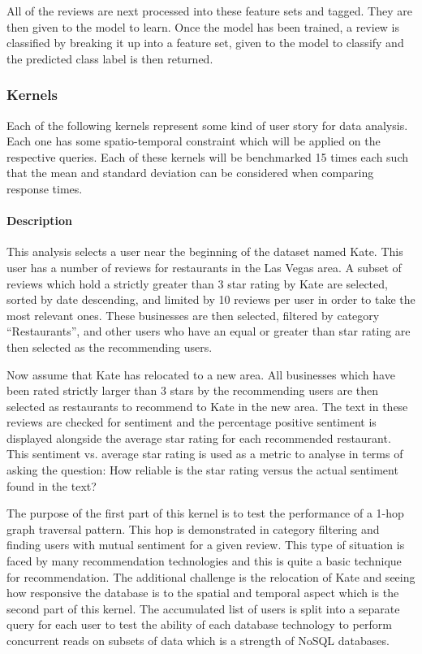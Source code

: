 All of the reviews are next processed into these feature sets and tagged. They are then given to the model to learn. Once the model has been trained, a review is classified by breaking it up into a feature set, given to the model to classify and the predicted class label is then returned.

\subsubsection{Kernels}
\label{sec:kernels}

Each of the following kernels represent some kind of user story for data analysis. Each one has some spatio-temporal constraint which will be applied on the respective queries. Each of these kernels will be benchmarked 15 times each such that the mean and standard deviation can be considered when comparing response times.


\paragraph{Description}
This analysis selects a user near the beginning of the dataset named Kate. This user has a number of reviews for restaurants in the Las Vegas area. A subset of reviews which hold a strictly greater than 3 star rating by Kate are selected, sorted by date descending, and limited by 10 reviews per user in order to take the most relevant ones. These businesses are then selected, filtered by category ``Restaurants'', and other users who have an equal or greater than star rating are then selected as the recommending users.

Now assume that Kate has relocated to a new area. All businesses which have been rated strictly larger than 3 stars by the recommending users are then selected as restaurants to recommend to Kate in the new area. The text in these reviews are checked for sentiment and the percentage positive sentiment is displayed alongside the average star rating for each recommended restaurant. This sentiment vs. average star rating is used as a metric to analyse in terms of asking the question: How reliable is the star rating versus the actual sentiment found in the text?

The purpose of the first part of this kernel is to test the performance of a 1-hop graph traversal pattern. This hop is demonstrated in category filtering and finding users with mutual sentiment for a given review. This type of situation is faced by many recommendation technologies and this is quite a basic technique for recommendation. The additional challenge is the relocation of Kate and seeing how responsive the database is to the spatial and temporal aspect which is the second part of this kernel. The accumulated list of users is split into a separate query for each user to test the ability of each database technology to perform concurrent reads on subsets of data which is a strength of NoSQL databases.

